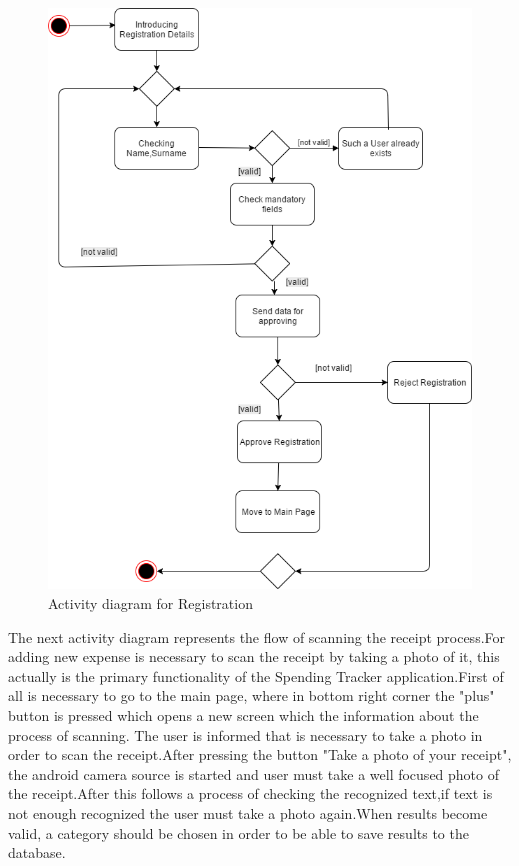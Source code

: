 \begin{figure}[H]
	\centering
	\includegraphics[width=18cm]{Chapter2/activityregistration.png}
	\caption{Activity diagram for Registration}
	\label{fig:firstactivity}
\end{figure}
\newpage
The next activity diagram represents the flow of scanning the receipt process.For adding new expense is necessary to scan the receipt by taking a photo of it, this actually is the primary functionality of the Spending Tracker application.First of all is necessary to go to the main page, where in bottom right corner the "plus" button is pressed which opens a new screen which the information about the process of scanning. The user is informed that is necessary to take a photo in order to scan the receipt.After pressing the button "Take a photo of your receipt", the android camera source is started and user must take a well focused photo of the receipt.After this follows a process of checking the recognized text,if text is not enough recognized the user must take a photo again.When results become valid, a category should be chosen in order to be able to save results to the database.
